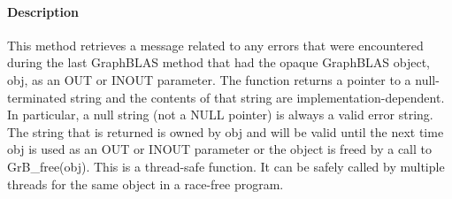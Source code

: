 \paragraph{Description}

This method retrieves a message related to any errors that were encountered 
during the last GraphBLAS method that had the opaque GraphBLAS object, 
{\sf obj}, as an {\sf OUT} or {\sf INOUT} parameter.   The function returns a 
pointer to a null-terminated string and the contents of that string are 
implementation-dependent.  In particular, a null 
string (not a {\sf NULL} pointer) is always a valid error string.  The string 
that is returned is owned by {\sf obj} and will be valid until the next time 
{\sf obj} is used as an {\sf OUT} or {\sf INOUT} parameter or the object is freed
by a call to {\sf GrB\_free(obj)}.
{\color{red}
This is a thread-safe function.  It can be safely called by multiple threads for the 
same object in a race-free program.}
